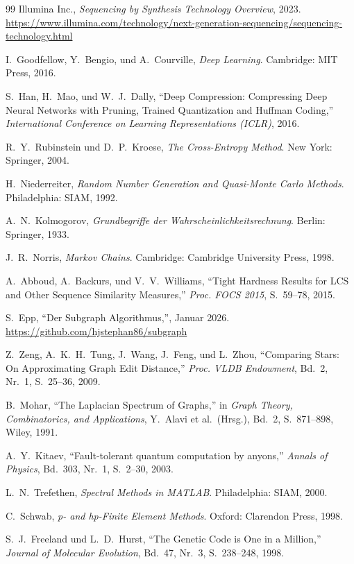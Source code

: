 ﻿\documentclass[a4paper,12pt]{article}
\theoremstyle{definition}
\begin{document}
\begin{thebibliography}{99}
Illumina Inc., \textit{Sequencing by Synthesis Technology Overview}, 2023. \url{https://www.illumina.com/technology/next-generation-sequencing/sequencing-technology.html}

I.~Goodfellow, Y.~Bengio, und A.~Courville, \textit{Deep Learning}. Cambridge: MIT Press, 2016.

S.~Han, H.~Mao, und W.~J.~Dally, ``Deep Compression: Compressing Deep Neural Networks with Pruning, Trained Quantization and Huffman Coding,'' \textit{International Conference on Learning Representations (ICLR)}, 2016.

R.~Y.~Rubinstein und D.~P.~Kroese, \textit{The Cross-Entropy Method}. New York: Springer, 2004.

H.~Niederreiter, \textit{Random Number Generation and Quasi-Monte Carlo Methods}. Philadelphia: SIAM, 1992.

A.~N.~Kolmogorov, \textit{Grundbegriffe der Wahrscheinlichkeitsrechnung}. Berlin: Springer, 1933.

J.~R.~Norris, \textit{Markov Chains}. Cambridge: Cambridge University Press, 1998.

A.~Abboud, A.~Backurs, und V.~V.~Williams, ``Tight Hardness Results for LCS and Other Sequence Similarity Measures,'' \textit{Proc. FOCS 2015}, S.~59--78, 2015.

S.~Epp, ``Der Subgraph Algorithmus,'', Januar 2026. \url{https://github.com/hjstephan86/subgraph}

Z.~Zeng, A.~K.~H.~Tung, J.~Wang, J.~Feng, und L.~Zhou, ``Comparing Stars: On Approximating Graph Edit Distance,'' \textit{Proc. VLDB Endowment}, Bd.~2, Nr.~1, S.~25--36, 2009.

B.~Mohar, ``The Laplacian Spectrum of Graphs,'' in \textit{Graph Theory, Combinatorics, and Applications}, Y.~Alavi et al.\ (Hrsg.), Bd.~2, S.~871--898, Wiley, 1991.

A.~Y.~Kitaev, ``Fault-tolerant quantum computation by anyons,'' \textit{Annals of Physics}, Bd.~303, Nr.~1, S.~2--30, 2003.

L.~N.~Trefethen, \textit{Spectral Methods in MATLAB}. Philadelphia: SIAM, 2000.

C.~Schwab, \textit{p- and hp-Finite Element Methods}. Oxford: Clarendon Press, 1998.

S.~J.~Freeland und L.~D.~Hurst, ``The Genetic Code is One in a Million,'' \textit{Journal of Molecular Evolution}, Bd.~47, Nr.~3, S.~238--248, 1998.

\end{thebibliography}
\end{document}
